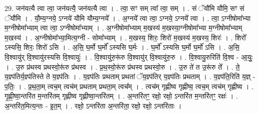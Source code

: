 \documentclass[17pt]{extarticle}
\begin{document}
29. जन॑यत्यै त्वा त्वा॒ जन॑यत्यै॒ जन॑यत्यै त्वा । . त्वा॒ सꣳ सम् त्वा᳚ त्वा॒ सम् । . सं ॅयौ॑मि यौमि॒ सꣳ सं ॅयौ॑मि । . यौ॒म्य॒ग्नये॒ ऽग्नये॑ यौमि यौम्य॒ग्नये᳚ । . अ॒ग्नये᳚ त्वा त्वा॒ ऽग्नये॒ ऽग्नये᳚ त्वा । . त्वा॒ ऽग्नीषोमा᳚भ्या म॒ग्नीषोमा᳚भ्याम् त्वा त्वा॒ ऽग्नीषोमा᳚भ्याम् । . अ॒ग्नीषोमा᳚भ्याम् म॒खस्य॑ म॒खस्या॒ग्नीषोमा᳚भ्या म॒ग्नीषोमा᳚भ्याम् म॒खस्य॑ । . अ॒ग्नीषोमा᳚भ्या॒मित्य॒ग्नी - सोमा᳚भ्याम् । . म॒खस्य॒ शिरः॒ शिरो॑ म॒खस्य॑ म॒खस्य॒ शिरः॑ । . शिरो᳚ ऽस्यसि॒ शिरः॒ शिरो॑ ऽसि । . अ॒सि॒ घ॒र्मो घ॒र्मो᳚ ऽस्यसि घ॒र्मः । . घ॒र्मो᳚ ऽस्यसि घ॒र्मो घ॒र्मो॑ ऽसि । . अ॒सि॒ वि॒श्वायु॑र् वि॒श्वायु॑रस्यसि वि॒श्वायुः॑ । . वि॒श्वायु॑रु॒रू॑रु वि॒श्वायु॑र् वि॒श्वायु॑रु॒रु । . वि॒श्वायु॒रुरिति॑ वि॒श्व - आ॒युः॒ । . उ॒रु प्र॑थस्व प्रथस्वो॒रू॑रु प्र॑थस्व । . प्र॒थ॒स्वो॒रू॑रु प्र॑थस्व प्रथस्वो॒रु । . उ॒रु ते॑ त उ॒रू॑रु ते᳚ । . ते॒ य॒ज्ञ्प॑तिर्य॒ज्ञ्प॑तिस्ते ते य॒ज्ञ्प॑तिः । . य॒ज्ञ्प॑तिः प्रथताम् प्रथतां ॅय॒ज्ञ्प॑तिर् य॒ज्ञ्प॑तिः प्रथताम् । . य॒ज्ञ्प॑ति॒रिति॑ य॒ज्ञ् - प॒तिः॒ । . प्र॒थ॒ता॒म् त्वच॒म् त्वच॑म् प्रथताम् प्रथता॒म् त्वच᳚म् । . त्वच॑म् गृह्णीष्व गृह्णीष्व॒ त्वच॒म् त्वच॑म् गृह्णीष्व । . गृ॒ह्णी॒ष्वा॒न्तरि॑त म॒न्तरि॑तम् गृह्णीष्व गृह्णीष्वा॒न्तरि॑तम् । . अ॒न्तरि॑तꣳ॒॒ रक्षो॒ रक्षो॒ ऽन्तरि॑त म॒न्तरि॑तꣳ॒॒ रक्षः॑ । . अ॒न्तरि॑त॒मित्य॒न्तः - इ॒त॒म् । . रक्षो॒ ऽन्तरि॑ता अ॒न्तरि॑ता॒ रक्षो॒ रक्षो॒ ऽन्तरि॑ताः । \newline
\end{document}

